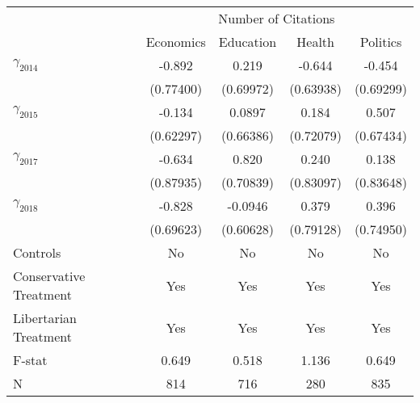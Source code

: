 \def\sym#1{\ifmmode^{#1}\else\(^{#1}\)\fi}
\setlength\tabcolsep{15pt}
\begin{tabular}{@{\extracolsep{7pt}}lcccc}
\toprule
                    &\multicolumn{4}{c}{Number of Citations}                                                \\\cmidrule(lr){2-5}
                    &\multicolumn{1}{c}{Economics}         &\multicolumn{1}{c}{Education}         &\multicolumn{1}{c}{Health}         &\multicolumn{1}{c}{Politics}         \\
\midrule
\large $\gamma_{2014}$&      -0.892         &       0.219         &      -0.644         &      -0.454         \\
                    &   (0.77400)         &   (0.69972)         &   (0.63938)         &   (0.69299)         \\
\addlinespace
\large $\gamma_{2015}$&      -0.134         &      0.0897         &       0.184         &       0.507         \\
                    &   (0.62297)         &   (0.66386)         &   (0.72079)         &   (0.67434)         \\
\addlinespace
\large $\gamma_{2017}$&      -0.634         &       0.820         &       0.240         &       0.138         \\
                    &   (0.87935)         &   (0.70839)         &   (0.83097)         &   (0.83648)         \\
\addlinespace
\large $\gamma_{2018}$&      -0.828         &     -0.0946         &       0.379         &       0.396         \\
                    &   (0.69623)         &   (0.60628)         &   (0.79128)         &   (0.74950)         \\
\midrule
Controls            &         No         &         No         &         No         &         No         \\
Conservative Treatment&         Yes         &         Yes         &         Yes         &         Yes         \\
Libertarian Treatment&         Yes         &         Yes         &         Yes         &         Yes         \\
F-stat              &       0.649         &       0.518         &       1.136         &       0.649         \\
N                   &         814         &         716         &         280         &         835         \\
\bottomrule
\end{tabular}
